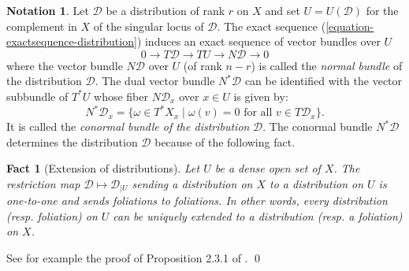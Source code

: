 \documentclass[12pt]{amsart}
\theoremstyle{definition}
\newtheorem{notation}[definition]{Notation}
\theoremstyle{plain}
\newtheorem{fact}[definition]{Fact}
\theoremstyle{exampstyle}
\theoremstyle{exampstyle}\newtheorem{thmxbis}{Theorem}
\numberwithin{equation}{section}
\theoremstyle{remark}
\begin{document}
\begin{notation} \label{notation-normal-bundle}
Let $\mathcal D$ be a distribution of rank $r$ on $X$ and set $U = U(\mathcal D)$ for the complement in $X$ of the singular locus of $\mathcal D$. The exact sequence (\ref{equation-exactsequence-distribution}) induces an exact sequence of vector bundles over $U$ 
\begin{equation} 0 \rightarrow T\mathcal D \rightarrow TU \rightarrow N\mathcal D \rightarrow 0
\end{equation} 
where the vector bundle $N\mathcal D$ over $U$ (of rank $n - r$) is called the {\em normal bundle} of the distribution $\mathcal D$. The dual vector bundle $N^\ast\mathcal D$ can be identified with the vector subbundle of $T^\ast U$ whose fiber $N\mathcal D_x$ over $x \in U$ is given by: 
$$N^\ast\mathcal D_x = \lbrace \omega \in T^\ast X_x \mid \omega(v) = 0 \text{ for all } v \in T\mathcal D_x \rbrace.$$ 
It is called the {\em conormal bundle of the distribution} $\mathcal D$. The conormal bundle $N^\ast\mathcal D$  determines the distribution $\mathcal D$ because of the following fact. 
\end{notation}



\begin{fact}[Extension of distributions] \label{fact-extension distribution}
Let $U$ be a dense open set of $X$. The restriction map 
$\mathcal D \mapsto \mathcal D_{\mid U}$
sending a distribution on $X$ to a distribution on $U$ is {\em one-to-one} and sends foliations to foliations. In other words, every distribution (resp. foliation) on $U$ can be uniquely extended to a distribution (resp. a foliation) on $X$. 
\end{fact} 

See for example the proof of Proposition 2.3.1 of \cite{jaoui-ANT}. \qed
\end{document}
